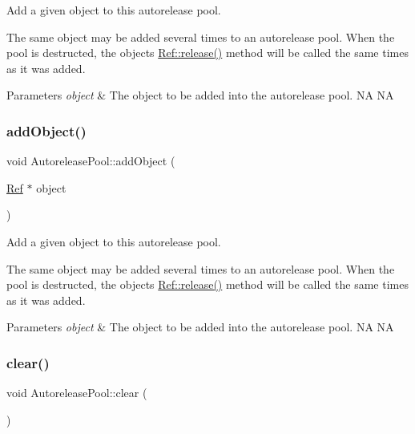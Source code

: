 Add a given object to this autorelease pool.

The same object may be added several times to an autorelease pool. When the pool is destructed, the object\textquotesingle{}s {\ttfamily \hyperlink{classRef_a6c8528cd8731765688943496c2eb3907}{Ref\+::release()}} method will be called the same times as it was added.


\begin{DoxyParams}{Parameters}
{\em object} & The object to be added into the autorelease pool.  NA  NA \\
\hline
\end{DoxyParams}
\mbox{\label{classAutoreleasePool_ad040d66ae891c4593ed8939bb53ce539}} 
\subsubsection{\texorpdfstring{add\+Object()}{addObject()}\hspace{0.1cm}{\footnotesize\ttfamily [2/2]}}
{\footnotesize\ttfamily void Autorelease\+Pool\+::add\+Object (\begin{DoxyParamCaption}\item[{\hyperlink{classRef}{Ref} $\ast$}]{object }\end{DoxyParamCaption})}

Add a given object to this autorelease pool.

The same object may be added several times to an autorelease pool. When the pool is destructed, the object\textquotesingle{}s {\ttfamily \hyperlink{classRef_a6c8528cd8731765688943496c2eb3907}{Ref\+::release()}} method will be called the same times as it was added.


\begin{DoxyParams}{Parameters}
{\em object} & The object to be added into the autorelease pool.  NA  NA \\
\hline
\end{DoxyParams}
\mbox{\label{classAutoreleasePool_a4a63abbe5e742993c70760810d1a8442}} 
\subsubsection{\texorpdfstring{clear()}{clear()}\hspace{0.1cm}{\footnotesize\ttfamily [1/2]}}
{\footnotesize\ttfamily void Autorelease\+Pool\+::clear (\begin{DoxyParamCaption}{ }\end{DoxyParamCaption})}

